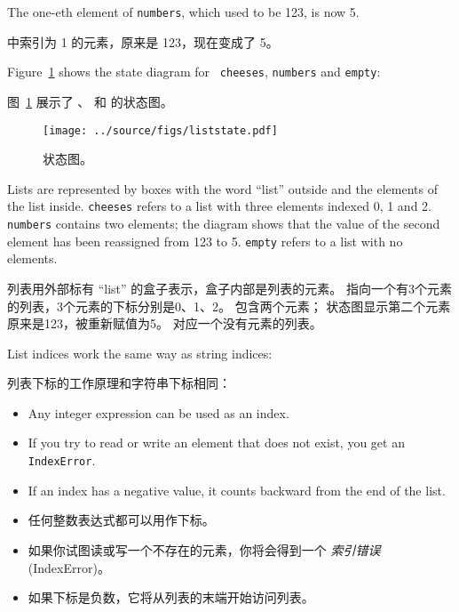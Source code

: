 %
The one-eth element of {\tt numbers}, which
used to be 123, is now 5.

 中索引为 1 的元素，原来是 123，现在变成了 5。
  

Figure~\ref{fig.liststate} shows the state diagram for {\tt
cheeses}, {\tt numbers} and {\tt empty}:
  

图~\ref{fig.liststate} 展示了  、  和  的状态图。

\begin{figure}
\centerline
{\texttt{[image: ../source/figs/liststate.pdf]}}
\caption{状态图。}
\label{fig.liststate}
\end{figure}

Lists are represented by boxes with the word ``list'' outside
and the elements of the list inside.  {\tt cheeses} refers to
a list with three elements indexed 0, 1 and 2.
{\tt numbers} contains two elements; the diagram shows that the
value of the second element has been reassigned from 123 to 5.
{\tt empty} refers to a list with no elements.
  

列表用外部标有 ``list'' 的盒子表示，盒子内部是列表的元素。  指向一个有3个元素的列表，3个元素的下标分别是0、1、2。  包含两个元素；
状态图显示第二个元素原来是123，被重新赋值为5。  对应一个没有元素的列表。

List indices work the same way as string indices:

列表下标的工作原理和字符串下标相同：

\begin{itemize}

\item Any integer expression can be used as an index.

\item If you try to read or write an element that does not exist, you
get an {\tt IndexError}.
  

\item If an index has a negative value, it counts backward from the
end of the list.

\end{itemize}

\begin{itemize}

\item 任何整数表达式都可以用作下标。

\item 如果你试图读或写一个不存在的元素，你将会得到一个 {\em 索引错误} (IndexError)。

\item 如果下标是负数，它将从列表的末端开始访问列表。

\end{itemize}
  
  

